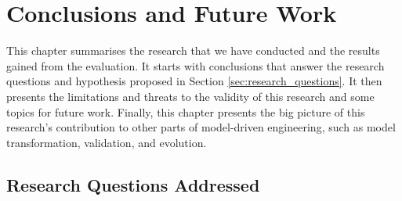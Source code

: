 \chapter{Conclusions and Future Work}
\label{ch:conclusions_and_future_work}

This chapter summarises the research that we have conducted and the results gained from the evaluation. It starts with conclusions that answer the research questions and hypothesis proposed in Section \ref{sec:research_questions}. It then presents the limitations and threats to the validity of this research and some topics for future work. Finally, this chapter presents the big picture of this research’s contribution to other parts of model-driven engineering, such as model transformation, validation, and evolution.

\section{Research Questions Addressed}
\label{conclusions_overall}

